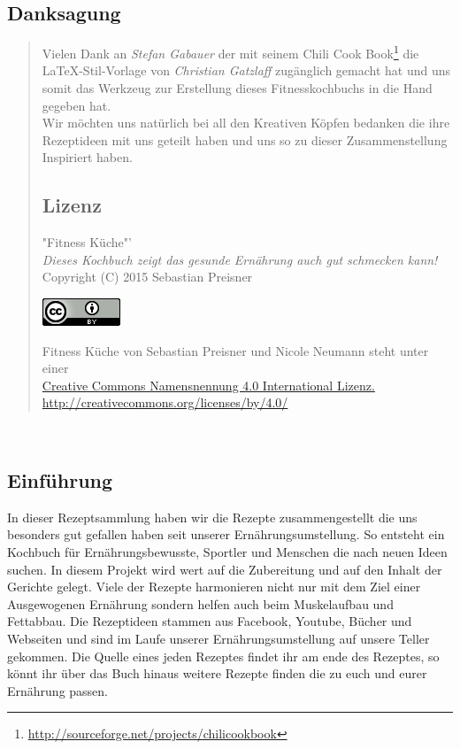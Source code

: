 \documentclass[a4paper]{scrartcl}
\begin{document}
\subsection*{\centering Danksagung}
\begin{quote}
Vielen Dank an \emph{Stefan Gabauer} der mit seinem Chili Cook Book\footnote{\url{http://sourceforge.net/projects/chilicookbook}} die \LaTeX-Stil-Vorlage von \emph{Christian Gatzlaff} zugänglich gemacht hat und uns somit das Werkzeug zur Erstellung dieses Fitnesskochbuchs in die Hand gegeben hat.\\

Wir möchten uns natürlich bei all den Kreativen Köpfen bedanken die ihre Rezeptideen mit uns geteilt haben und uns so zu dieser Zusammenstellung Inspiriert haben.
\vspace{2cm}

\subsection*{\centering Lizenz}
\begin{center}
"Fitness Küche"'\\
\textit{Dieses Kochbuch zeigt das gesunde Ernährung auch gut schmecken kann!}\\
Copyright (C) 2015 Sebastian Preisner\\

\begin{center}
	\href{http://creativecommons.org/licenses/by-nc-sa/3.0/de/}{\includegraphics{cclogo.png}}
\end{center}

Fitness Küche von Sebastian Preisner und Nicole Neumann steht unter einer\\ \href{http://creativecommons.org/licenses/by/4.0/}{Creative Commons Namensnennung 4.0 International Lizenz.}\\
\url{http://creativecommons.org/licenses/by/4.0/}
\end{center}
\end{quote}

\newpage~
\subsection*{Einführung}
In dieser Rezeptsammlung haben wir die Rezepte zusammengestellt die uns besonders gut gefallen haben seit unserer Ernährungsumstellung. So entsteht ein Kochbuch für Ernährungsbewusste, Sportler und Menschen die nach neuen Ideen suchen. In diesem Projekt wird wert auf die Zubereitung und auf den Inhalt der Gerichte gelegt. Viele der Rezepte harmonieren nicht nur mit dem Ziel einer Ausgewogenen Ernährung sondern helfen auch beim Muskelaufbau und Fettabbau. 
Die Rezeptideen stammen aus Facebook, Youtube, Bücher und Webseiten und sind im Laufe unserer 
Ernährungsumstellung auf unsere Teller gekommen. Die Quelle eines jeden Rezeptes findet ihr am ende des Rezeptes, so könnt ihr über das Buch hinaus weitere Rezepte finden die zu euch und eurer Ernährung passen. 
\end{document}
